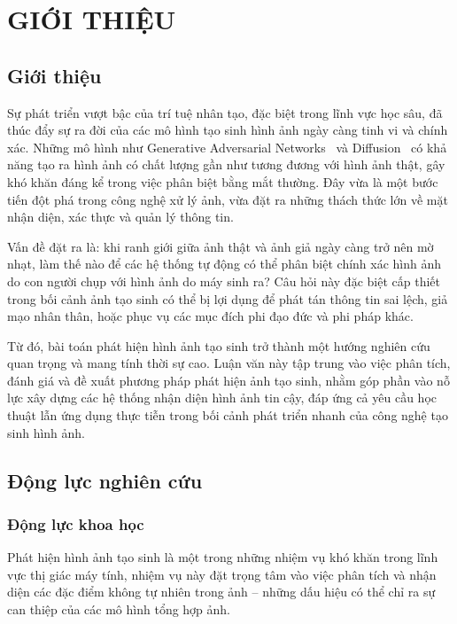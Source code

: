 \chapter{GIỚI THIỆU}
\label{Chapter1}
%
\section{Giới thiệu}

Sự phát triển vượt bậc của trí tuệ nhân tạo, đặc biệt trong lĩnh vực học sâu, đã thúc đẩy sự ra đời của các mô hình tạo sinh hình ảnh ngày càng tinh vi và chính xác. Những mô hình như Generative Adversarial Networks~\cite{Goodfellow2014GenerativeAN} và Diffusion~\cite{Ho2020DenoisingDP} có khả năng tạo ra hình ảnh có chất lượng gần như tương đương với hình ảnh thật, gây khó khăn đáng kể trong việc phân biệt bằng mắt thường. Đây vừa là một bước tiến đột phá trong công nghệ xử lý ảnh, vừa đặt ra những thách thức lớn về mặt nhận diện, xác thực và quản lý thông tin.

Vấn đề đặt ra là: khi ranh giới giữa ảnh thật và ảnh giả ngày càng trở nên mờ nhạt, làm thế nào để các hệ thống tự động có thể phân biệt chính xác hình ảnh do con người chụp với hình ảnh do máy sinh ra? Câu hỏi này đặc biệt cấp thiết trong bối cảnh ảnh tạo sinh có thể bị lợi dụng để phát tán thông tin sai lệch, giả mạo nhân thân, hoặc phục vụ các mục đích phi đạo đức và phi pháp khác.

Từ đó, bài toán phát hiện hình ảnh tạo sinh trở thành một hướng nghiên cứu quan trọng và mang tính thời sự cao. Luận văn này tập trung vào việc phân tích, đánh giá và đề xuất phương pháp phát hiện ảnh tạo sinh, nhằm góp phần vào nỗ lực xây dựng các hệ thống nhận diện hình ảnh tin cậy, đáp ứng cả yêu cầu học thuật lẫn ứng dụng thực tiễn trong bối cảnh phát triển nhanh của công nghệ tạo sinh hình ảnh.
%
\section{Động lực nghiên cứu}
%
\subsection{Động lực khoa học}
Phát hiện hình ảnh tạo sinh là một trong những nhiệm vụ khó khăn trong lĩnh vực thị giác máy tính, nhiệm vụ này đặt trọng tâm vào việc phân tích và nhận diện các đặc điểm không tự nhiên trong ảnh – những dấu hiệu có thể chỉ ra sự can thiệp của các mô hình tổng hợp ảnh. 
%
%

